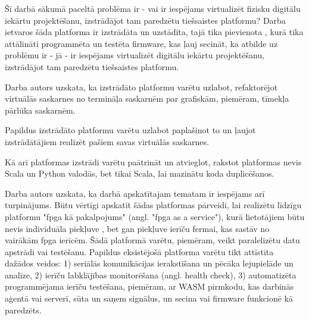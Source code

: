 Šī darbā sākumā paceltā problēma ir - vai ir iespējams virtualizēt fizisku
digitālu iekārtu projektēšanu, izstrādājot tam paredzētu tiešsaistes platformu?
Darba ietvaros šāda platforma ir izstrādāta un uzstādīta, tajā tika pievienota
, kurā tika attālināti programmēta un testēta
\gls{firmware}, kas ļauj secināt, ka atbilde uz problēmu ir - jā - ir iespējams
virtualizēt digitālu iekārtu projektēšanu, izstrādājot tam paredzētu tiešsaistes
platformu.

Darba autors uzskata, ka izstrādāto platformu varētu uzlabot, refaktorējot
virtuālās saskarnes no termināļa saskarnēm par grafiskām, piemēram, tīmekļa
pārlūka saskarnēm.

Papildus izstrādāto platformu varētu uzlabot paplašinot to un ļaujot
izstrādātājiem realizēt pašiem savas virtuālās saskarnes.

Kā arī platformas izstrādi varētu paātrināt un atvieglot, rakstot platformas
 nevis Scala un Python valodās, bet tikai
Scala, lai mazinātu koda duplicēšanos.

Darba autors uzskata, ka darbā apskatītajam tematam ir iespējams arī
turpinājums. Būtu vērtīgi apskatīt šādas platformas pārveidi, lai realizētu
līdzīgu platformu "\gls{fpga} kā pakalpojums" (angl. "\gls{fpga} as a service"),
kurā lietotājiem būtu nevis individuāla piekļuve ,
bet gan piekļuve ierīču fermai, kas sastāv no vairākām \gls{fpga} ierīcēm. Šādā
platformā varētu, piemēram, veikt paralelizētu datu apstrādi vai testēšanu.
Papildus eksistējošā platforma varētu tikt attīstīta dažādos veidos: 1) seriālās
komunikācijas ierakstīšana un pēcāka lejupielāde un analīze, 2) ierīču
labklājības monitorēšana (angl. health check), 3) automatizēta programmējama
ierīču testēšana, piemēram, ar WASM pirmkodu, kas darbinās aģentā vai serverī,
sūta un saņem signālus, un secina vai  \gls{firmware}
funkcionē kā paredzēts.
